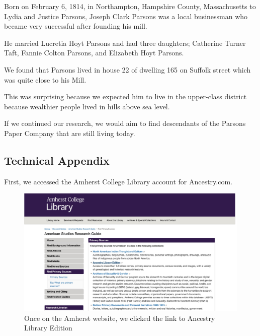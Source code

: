 \documentclass[
  letterpaper,
  DIV=11,
  numbers=noendperiod]{scrartcl}
\begin{document}
Born on February 6, 1814, in Northampton, Hampshire County,
Massachusetts to Lydia and Justice Parsons, Joseph Clark Parsons was a
local businessman who became very successful after founding his mill.

He married Lucretia Hoyt Parsons and had three daughters; Catherine
Turner Taft, Fannie Colton Parsons, and Elizabeth Hoyt Parsons.

We found that Parsons lived in house 22 of dwelling 165 on Suffolk
street which was quite close to his Mill.

This was surprising because we expected him to live in the upper-class
district because wealthier people lived in hills above sea level.~

If we continued our research, we would aim to find descendants of the
Parsons Paper Company that are still living today.

\newpage{}

\hypertarget{technical-appendix}{%
\subsection{\texorpdfstring{\textbf{Technical
Appendix}}{Technical Appendix}}\label{technical-appendix}}

First, we accessed the Amherst College Library account for Ancestry.com.

\begin{figure}

{\centering \includegraphics[width=\textwidth,height=0.3\textheight]{amherst_website.png}

}

\caption{\label{fig-sample1}Once on the Amherst website, we clicked the
link to Ancestry Library Edition}

\end{figure}
\end{document}
